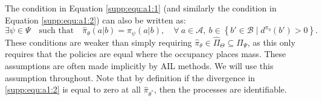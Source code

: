 The condition in Equation \eqref{supp:equ:a1:1} (and similarly the condition in Equation \eqref{supp:equ:a1:2}) can also be written as:
\begin{equation}
    \exists \psi \in \Psi \quad \text{such\ that} \quad \hat{\pi}_{\theta}(a|b) = \pi_{\psi}(a|b), \quad \forall\ a \in \mathcal{A},\ b \in \left\lbrace b' \in \mathcal{B} \mid d^{\pi_{\eta}}(b') > 0 \right\rbrace.
\end{equation}
These conditions are weaker than simply requiring $\hat{\pi}_{\theta} \in \hat{\Pi}_{\Theta} \subseteq \Pi_{\Psi}$, as this only requires that the policies are equal where the occupancy places mass.  These assumptions are often made implicitly by AIL methods.  We will use this assumption throughout.  Note that by definition if the divergence in \eqref{supp:equ:a1:2} is equal to zero at all $\hat{\pi}_{\theta^*}$, then the processes are identifiable.  

